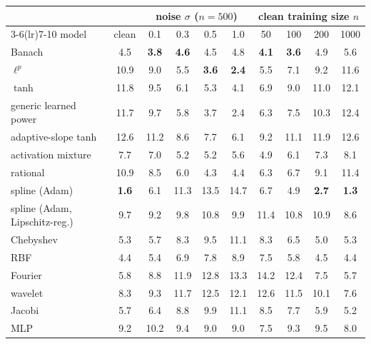 \begin{tabular}{lccccccccc}
\toprule
 & & \multicolumn{4}{c}{noise $\sigma$ ($n=500$)} & \multicolumn{4}{c}{clean training size $n$} \\
\cmidrule(lr){3-6}\cmidrule(lr){7-10}
model & clean & 0.1 & 0.3 & 0.5 & 1.0 & 50 & 100 & 200 & 1000 \\
\midrule
Banach & 4.5 & \textbf{3.8} & \textbf{4.6} & 4.5 & 4.8 & \textbf{4.1} & \textbf{3.6} & 4.9 & 5.6 \\
$\ell^p$ & 10.9 & 9.0 & 5.5 & \textbf{3.6} & \textbf{2.4} & 5.5 & 7.1 & 9.2 & 11.6 \\
\midrule
$\tanh$ & 11.8 & 9.5 & 6.1 & 5.3 & 4.1 & 6.9 & 9.0 & 11.0 & 12.1 \\
generic learned power & 11.7 & 9.7 & 5.8 & 3.7 & 2.4 & 6.3 & 7.5 & 10.3 & 12.4 \\
adaptive-slope tanh & 12.6 & 11.2 & 8.6 & 7.7 & 6.1 & 9.2 & 11.1 & 11.9 & 12.6 \\
activation mixture & 7.7 & 7.0 & 5.2 & 5.2 & 5.6 & 4.9 & 6.1 & 7.3 & 8.1 \\
rational & 10.9 & 8.5 & 6.0 & 4.3 & 4.4 & 6.3 & 6.7 & 9.1 & 11.4 \\
spline (Adam) & \textbf{1.6} & 6.1 & 11.3 & 13.5 & 14.7 & 6.7 & 4.9 & \textbf{2.7} & \textbf{1.3} \\
spline (Adam, Lipschitz-reg.) & 9.7 & 9.2 & 9.8 & 10.8 & 9.9 & 11.4 & 10.8 & 10.9 & 8.6 \\
Chebyshev & 5.3 & 5.7 & 8.3 & 9.5 & 11.1 & 8.3 & 6.5 & 5.0 & 5.3 \\
RBF & 4.4 & 5.4 & 6.9 & 7.8 & 8.9 & 7.5 & 5.8 & 4.5 & 4.4 \\
Fourier & 5.8 & 8.8 & 11.9 & 12.8 & 13.3 & 14.2 & 12.4 & 7.5 & 5.7 \\
wavelet & 8.3 & 9.3 & 11.7 & 12.5 & 12.1 & 12.6 & 11.5 & 10.1 & 7.6 \\
Jacobi & 5.7 & 6.4 & 8.8 & 9.9 & 11.1 & 8.5 & 7.7 & 5.9 & 5.2 \\
MLP & 9.2 & 10.2 & 9.4 & 9.0 & 9.0 & 7.5 & 9.3 & 9.5 & 8.0 \\
\bottomrule
\end{tabular}
